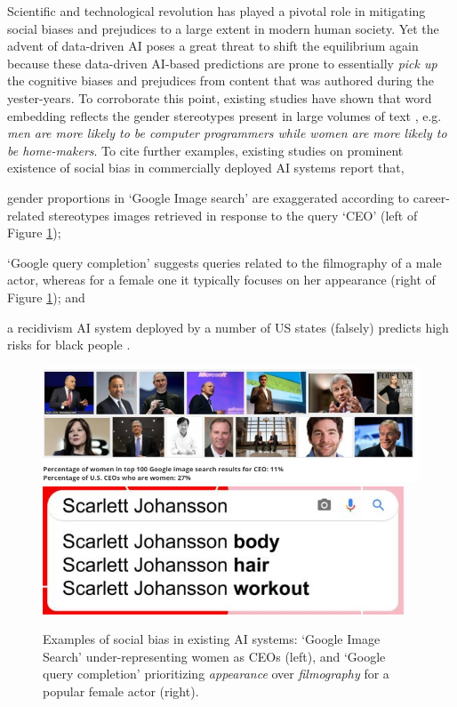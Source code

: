 \documentclass[letterpaper]{article}
\begin{document}
Scientific and technological revolution has played a pivotal role in mitigating social biases and prejudices to a large extent in modern human society. Yet the advent of data-driven AI poses a great threat to shift the equilibrium again because these data-driven AI-based predictions are prone to essentially \emph{pick up} the cognitive biases and prejudices from content that was authored during the yester-years. To corroborate this point,
existing studies have shown that word embedding reflects the gender stereotypes present in large volumes of text \citep{Bolukbasi:2016,manzini-etal-2019}, e.g. \emph{men are more likely to be computer programmers while women are more likely to be home-makers}.
To cite further examples, existing studies on prominent existence of social bias in commercially deployed AI systems report that,
\begin{inparaenum}[a)]
\item gender proportions in `Google Image search' are exaggerated according to career-related stereotypes images retrieved in response to the query `CEO' \citep{Kay:2015} (left of Figure \ref{fig:bias-in-existing-AI-tools});
\item  `Google query completion' suggests queries related to the filmography of a male actor, whereas for a female one it typically focuses on her appearance \citep{JamesTemperton2019} (right of Figure \ref{fig:bias-in-existing-AI-tools}); and
\item a recidivism AI system deployed by a number of US states (falsely) predicts high risks for black people \citep{ProPublica}. 
\end{inparaenum}

\begin{figure}[t]
    \centering
    \includegraphics[width=.75\columnwidth]{ceo.png}
    \includegraphics[width=.24\columnwidth]{qc.png}
    \caption{Examples of social bias in existing AI systems: `Google Image Search' under-representing women as CEOs (left), and `Google query completion' prioritizing \emph{appearance} over \emph{filmography} for a popular female actor (right).}
    \label{fig:bias-in-existing-AI-tools}
\end{figure}
\end{document}
